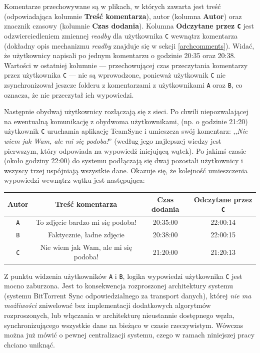 \documentclass[polish,a4paper,twoside]{ppfcmthesis}
\begin{document}
Komentarze przechowywane są w plikach, w których zawarta jest treść (odpowiadająca kolumnie \textbf{Treść komentarza}), autor (kolumna \textbf{Autor}) oraz znacznik czasowy (kolumnie \textbf{Czas dodania}). Kolumna \textbf{Odczytane przez \texttt{C}} jest odzwierciedleniem zmiennej \emph{readby} dla użytkownika \texttt{C} wewnątrz komentarza (dokładny opis mechanizmu \emph{readby} znajduje się w sekcji \ref{archcomments}). Widać, że użytkownicy napisali po jednym komentarzu o godzinie 20:35 oraz 20:38. Wartości w ostatniej kolumnie --- przechowującej czas przeczytania komentarzy przez użytkownika \texttt{C} --- nie są wprowadzone, ponieważ użytkownik \texttt{C} nie zsynchronizował jeszcze folderu z komentarzami z użytkownikami \texttt{A} oraz \texttt{B}, co oznacza, że nie przeczytał ich wypowiedzi.

Następnie obydwaj użytkownicy rozłączają się z sieci. Po chwili niepozwalającej na ewentualną komunikację z obydwoma użytkownikami, (np. o godzinie 21:20) użytkownik \texttt{C} uruchamia aplikację TeamSync i umieszcza swój komentarz: ,,\emph{Nie wiem jak Wam, ale mi się podoba!}'' (według jego najlepszej wiedzy jest pierwszym, który odpowiada na wypowiedź inicjującą wątek). Po jakimś czasie (około godziny 22:00) do systemu podłączają się dwaj pozostali użytkownicy i wszyscy trzej uspójniają wszystkie dane. Okazuje się, że kolejność umieszczenia wypowiedzi wewnątrz wątku jest następująca:

\vspace{5px}
\begin{center}
\begin{tabular}{c | c | c | c}
 \textbf{Autor} & \textbf{Treść komentarza} & \textbf{Czas dodania} & \textbf{Odczytane przez \texttt{C}}\\
 \hline
 \texttt{A} & To zdjęcie bardzo mi się podoba! & 20:35:00 & 22:00:14 \\
 \texttt{B} & Faktycznie, ładne zdjęcie & 20:38:00 & 22:00:15 \\
 \texttt{C} & Nie wiem jak Wam, ale mi się podoba! & 21:20:00 & 21:20:13
\end{tabular}
\end{center}
\vspace{5px}

Z punktu widzenia użytkowników \texttt{A} i \texttt{B}, logika wypowiedzi użytkownika \texttt{C} jest mocno zaburzona. Jest to konsekwencja rozproszonej architektury systemu (systemu BitTorrent Sync odpowiedzialnego za transport danych), której \emph{nie ma możliwości} zniwelować bez implementacji dodatkowych algorytmów rozproszonych, lub włączania w architekturę nieustannie dostępnego węzła, synchronizującego wszystkie dane na bieżąco w czasie rzeczywistym. Wówczas można już mówić o pewnej centralizacji systemu, czego w ramach niniejszej pracy chciano uniknąć.
\end{document}
